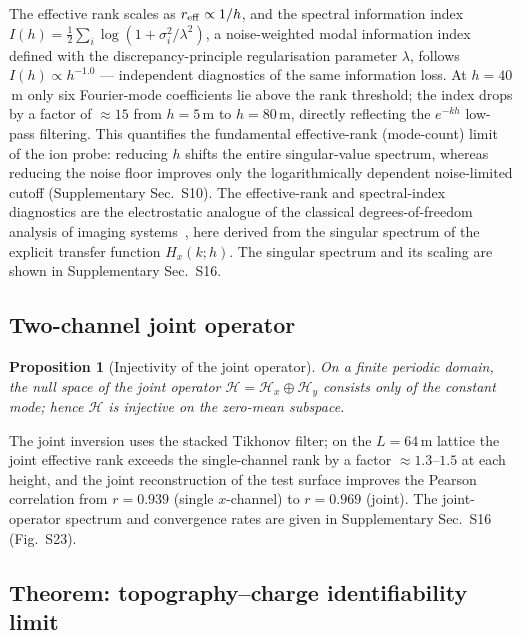 \documentclass[12pt,a4paper]{article}
\newtheorem{proposition}[theorem]{Proposition}
\begin{document}
The effective rank scales as $r_{\rm eff}\propto1/h$, and the spectral
information index
$I(h)=\tfrac12\sum_i\log(1+\sigma_i^2/\lambda^2)$, a noise-weighted modal
information index defined with the
discrepancy-principle regularisation parameter $\lambda$, follows $I(h)\propto h^{-1.0}$ ---
independent diagnostics of the same information loss.  At
$h=40$\,\textmu m only six Fourier-mode coefficients lie above the rank
threshold; the index drops by a factor of $\approx15$ from
$h=5$\,\textmu m to $h=80$\,\textmu m, directly reflecting the $e^{-kh}$
low-pass filtering.  This quantifies the fundamental effective-rank
(mode-count) limit of the ion probe: reducing $h$ shifts the entire
singular-value spectrum, whereas reducing the noise floor improves only
the logarithmically dependent noise-limited cutoff (Supplementary
Sec.~S10).  The effective-rank and spectral-index diagnostics are the
electrostatic analogue of the classical degrees-of-freedom analysis of
imaging systems~\cite{toraldodifrancia1969degrees,cox1986information},
here derived from the singular spectrum of the explicit transfer
function $H_x(k;h)$.  The singular spectrum and its scaling are shown in
Supplementary Sec.~S16.

\subsection{Two-channel joint operator}

\begin{proposition}[Injectivity of the joint operator]\label{prop:joint}
On a finite periodic domain, the null space of the joint operator
$\mathcal{H} = \mathcal{H}_x \oplus \mathcal{H}_y$ consists only of the
constant mode; hence $\mathcal{H}$ is injective on the zero-mean
subspace.
\end{proposition}

The joint inversion uses the stacked Tikhonov filter; on the
$L=64$\,\textmu m lattice the joint effective rank exceeds the
single-channel rank by a factor $\approx1.3$--$1.5$ at each height, and
the joint reconstruction of the test surface improves the Pearson
correlation from $r=0.939$ (single $x$-channel) to $r=0.969$ (joint).
The joint-operator spectrum and convergence rates are given in
Supplementary Sec.~S16 (Fig.~S23).

\subsection{Theorem: topography--charge identifiability limit}
\end{document}
